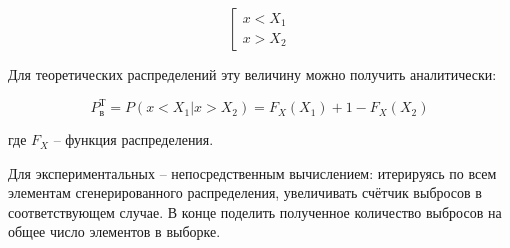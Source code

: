 \begin{equation}
\left[
\begin{array}{c}
x < X_1 \\
x > X_2
\end{array}
\right.
\end{equation}

Для теоретических распределений эту величину можно получить аналитически:

\begin{equation}\label{trashdata}
P_{\text{в}}^{\text{Т}}=P(x<X_1 | x > X_2) = F_X(X_1) + 1 - F_X(X_2)
\end{equation}

где $F_X$ -- функция распределения.

Для экспериментальных -- непосредственным вычислением: итерируясь по всем элементам сгенерированного распределения, увеличивать счётчик выбросов в соответствующем случае. В конце поделить полученное количество выбросов на общее число элементов в выборке.